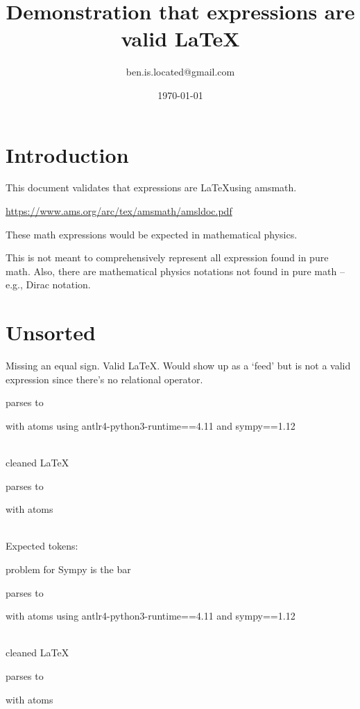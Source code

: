 \documentclass{article}
\title{Demonstration that expressions are valid \LaTeX}
\author{ben.is.located@gmail.com}
\date{\today}
\begin{document}
\maketitle

\section{Introduction}
This document validates that expressions are \LaTeX using amsmath. 

\href{https://www.ams.org/arc/tex/amsmath/amsldoc.pdf}{https://www.ams.org/arc/tex/amsmath/amsldoc.pdf}

These math expressions would be expected in mathematical physics.

This is not meant to comprehensively represent all expression found in pure math. Also, there are mathematical physics notations not found in pure math -- e.g., Dirac notation.

\section{Unsorted}

Missing an equal sign. Valid \LaTeX. Would show up as a `feed' but is not a valid expression since there's no relational operator.

parses to

with atoms
using antlr4-python3-runtime==4.11 and sympy==1.12

\ \\
cleaned \LaTeX

parses to

with atoms


\ \\
Expected tokens:



\hrulefill

problem for Sympy is the bar

parses to

with atoms
using antlr4-python3-runtime==4.11 and sympy==1.12

\ \\
cleaned \LaTeX

parses to

with atoms

\end{document}
